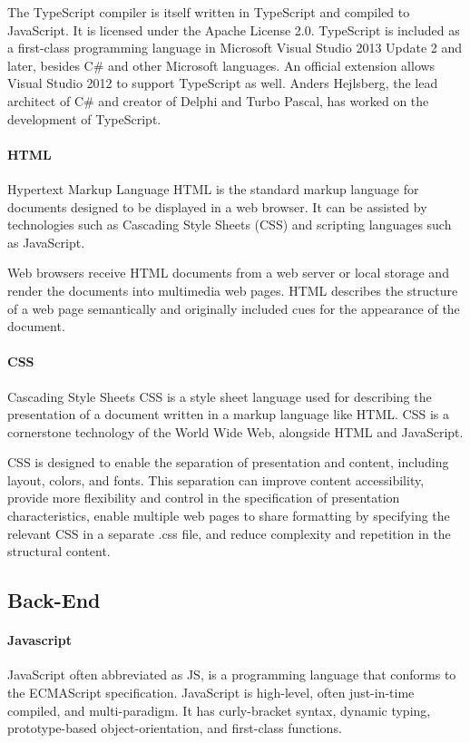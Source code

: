 The TypeScript compiler is itself written in TypeScript and compiled to JavaScript. It is licensed under the Apache License 2.0. TypeScript is included as a first-class programming language in Microsoft Visual Studio 2013 Update 2 and later, besides C\# and other Microsoft languages. An official extension allows Visual Studio 2012 to support TypeScript as well. Anders Hejlsberg, the lead architect of C\# and creator of Delphi and Turbo Pascal, has worked on the development of TypeScript.

\paragraph{HTML}
Hypertext Markup Language \ac{HTML} is the standard markup language for documents designed to be displayed in a web browser. It can be assisted by technologies such as Cascading Style Sheets (CSS) and scripting languages such as JavaScript.

Web browsers receive HTML documents from a web server or local storage and render the documents into multimedia web pages. HTML describes the structure of a web page semantically and originally included cues for the appearance of the document.



\paragraph{CSS}
Cascading Style Sheets \ac{CSS} is a style sheet language used for describing the presentation of a document written in a markup language like HTML. CSS is a cornerstone technology of the World Wide Web, alongside HTML and JavaScript.

\ac{CSS} is designed to enable the separation of presentation and content, including layout, colors, and fonts. This separation can improve content accessibility, provide more flexibility and control in the specification of presentation characteristics, enable multiple web pages to share formatting by specifying the relevant CSS in a separate .css file, and reduce complexity and repetition in the structural content.


\subsection{Back-End}
\paragraph{Javascript}
JavaScript often abbreviated as JS, is a programming language that conforms to the ECMAScript specification. JavaScript is high-level, often just-in-time compiled, and multi-paradigm. It has curly-bracket syntax, dynamic typing, prototype-based object-orientation, and first-class functions.
